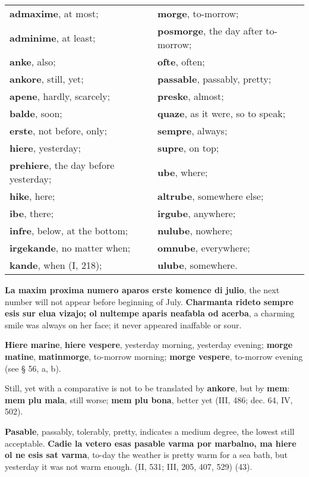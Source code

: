 \begin{tabular}{l l}
\textbf{admaxime}, at most; & \textbf{morge}, to-morrow; \\
\textbf{adminime}, at least; & \textbf{posmorge}, the day after to-morrow; \\
\textbf{anke}, also; & \textbf{ofte}, often; \\
\textbf{ankore}, still, yet; & \textbf{passable}, passably, pretty; \\
\textbf{apene}, hardly, scarcely; & \textbf{preske}, almost; \\
\textbf{balde}, soon; & \textbf{quaze}, as it were, so to speak; \\
\textbf{erste}, not before, only; & \textbf{sempre}, always; \\
\textbf{hiere}, yesterday; & \textbf{supre}, on top; \\
\textbf{prehiere}, the day before yesterday; & \textbf{ube}, where; \\
\textbf{hike}, here; & \textbf{altrube}, somewhere else; \\
\textbf{ibe}, there; & \textbf{irgube}, anywhere; \\
\textbf{infre}, below, at the bottom; & \textbf{nulube}, nowhere; \\
\textbf{irgekande}, no matter when; & \textbf{omnube}, everywhere; \\
\textbf{kande}, when (I, 218); & \textbf{ulube}, somewhere.
\end{tabular}

\textbf{La maxim proxima numero aparos erste komence di julio}, the next number will not appear before beginning of July. \textbf{Charmanta rideto sempre esis sur elua vizajo; ol nultempe aparis neafabla od acerba}, a charming smile was always on her face; it never appeared inaffable or sour.

\textbf{Hiere marine}, \textbf{hiere vespere}, yesterday morning, yesterday evening; \textbf{morge matine}, \textbf{matinmorge}, to-morrow morning; \textbf{morge vespere}, to-morrow evening (see § 56, a, b).

Still, yet with a comparative is not to be translated by \textbf{ankore}, but by \textbf{mem}: \textbf{mem plu mala}, still worse; \textbf{mem plu bona}, better yet (III, 486; dec. 64, IV, 502).

\textbf{Pasable}, passably, tolerably, pretty, indicates a medium degree, the lowest still acceptable. \textbf{Cadie la vetero esas pasable varma por marbalno, ma hiere ol ne esis sat varma}, to-day the weather is pretty warm for a sea bath, but yesterday it was not warm enough. (II, 531; III, 205, 407, 529) (43).

